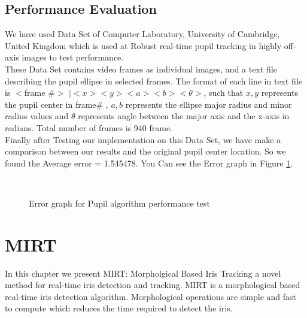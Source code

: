 \documentclass[12pt,fleqn]{book} %
\begin{document}
\section{Performance Evaluation} 
	We have used Data Set of Computer Laboratory, University of Cambridge, United Kingdom which is used at Robust real-time pupil tracking in highly off-axis images to test performance. \cite{swirski} \\
	These Data Set contains video frames as individual images, and a text file describing the pupil ellipse in selected frames. The format of each line in text file is $<$frame \#$>$ $| <x> <y> <a> <b> < \theta >$, such that $ x , y$ represents the pupil center in frame\# , $ a, b$ represents the ellipse major radius and minor radius  values and $\theta$ represents angle between the major axis and the x-axis in radians. Total number of frames is 940 frame. \\
	Finally after Testing our implementation on this Data Set, we have make a comparison between our results and the original pupil center location. So we found the Average error = 1.545478. You Can see the 	Error graph in Figure \ref{fig:ErrorGraph}.
		

\begin{figure}[]
\begin{dBox}
\centering
  \mbox{
   }
   \caption{Error graph for Pupil algorithm performance test
   \label{fig:ErrorGraph} }   
\end{dBox}   
\end{figure}


\chapter{MIRT} 
In this chapter we present MIRT: Morpholgical Based Iris Tracking a novel method for real-time iris detection and tracking. MIRT is a morphological based real-time iris detection algorithm. Morphological operations are simple and fast to compute which reduces the time required to detect the iris. 
\end{document}
